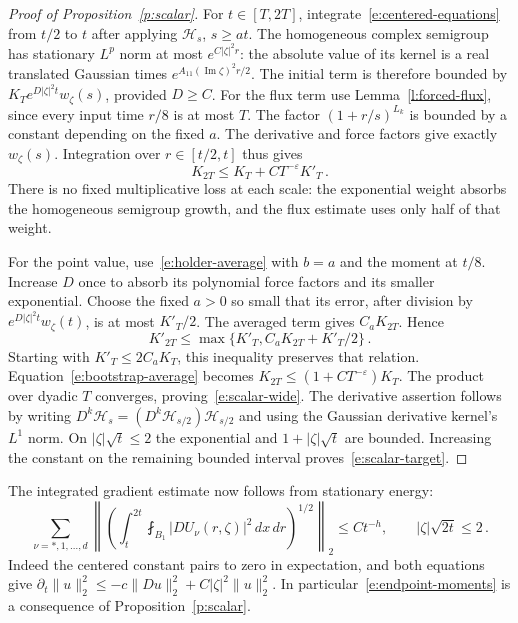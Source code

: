 \documentclass[11pt]{amsart}
\theoremstyle{definition}
\theoremstyle{remark}
\numberwithin{equation}{section}
\begin{document}
\begin{proof}[Proof of Proposition~\ref{p:scalar}]
For $t\in[T,2T]$, integrate~\eqref{e:centered-equations} from $t/2$ to $t$ after applying $\mathcal H_s$, $s\geq at$. The homogeneous complex semigroup has stationary $L^p$ norm at most $e^{C|\zeta|^2r}$: the absolute value of its kernel is a real translated Gaussian times $e^{A_{11}(\operatorname{Im}\zeta)^2r/2}$. The initial term is therefore bounded by $K_Te^{D|\zeta|^2t}w_\zeta(s)$, provided $D\geq C$. For the flux term use Lemma~\ref{l:forced-flux}, since every input time $r/8$ is at most $T$. The factor $(1+r/s)^{L_k}$ is bounded by a constant depending on the fixed $a$. The derivative and force factors give exactly $w_\zeta(s)$. Integration over $r\in[t/2,t]$ thus gives
\begin{equation}\label{e:bootstrap-average}
 K_{2T}\leq K_T+CT^{-\varepsilon}K'_T\, .
\end{equation}
There is no fixed multiplicative loss at each scale: the exponential weight absorbs the homogeneous semigroup growth, and the flux estimate uses only half of that weight.

For the point value, use~\eqref{e:holder-average} with $b=a$ and the moment at $t/8$. Increase $D$ once to absorb its polynomial force factors and its smaller exponential. Choose the fixed $a>0$ so small that its error, after division by $e^{D|\zeta|^2t}w_\zeta(t)$, is at most $K'_T/2$. The averaged term gives $C_aK_{2T}$. Hence
\begin{equation*}
 K'_{2T}\leq\max\{K'_T,C_aK_{2T}+K'_T/2\}\, .
\end{equation*}
Starting with $K'_T\leq2C_aK_T$, this inequality preserves that relation. Equation~\eqref{e:bootstrap-average} becomes $K_{2T}\leq(1+CT^{-\varepsilon})K_T$. The product over dyadic $T$ converges, proving~\eqref{e:scalar-wide}. The derivative assertion follows by writing $D^k\mathcal H_s=(D^k\mathcal H_{s/2})\mathcal H_{s/2}$ and using the Gaussian derivative kernel's $L^1$ norm. On $|\zeta|\sqrt t\leq2$ the exponential and $1+|\zeta|\sqrt t$ are bounded. Increasing the constant on the remaining bounded interval proves~\eqref{e:scalar-target}.
\end{proof}

The integrated gradient estimate now follows from stationary energy:
\begin{equation}\label{e:energy-target}
 \sum_{\nu=*,1,\ldots,d}
 \left\|\left(\int_t^{2t}\fint_{B_1}|DU_\nu(r,\zeta)|^2\,dx\,dr
                 \right)^{1/2}\right\|_2
 \leq Ct^{-h},\qquad |\zeta|\sqrt{2t}\leq2\, .
\end{equation}
Indeed the centered constant pairs to zero in expectation, and both equations give $\partial_t\|u\|_2^2\leq-c\|Du\|_2^2+C|\zeta|^2\|u\|_2^2$. In particular~\eqref{e:endpoint-moments} is a consequence of Proposition~\ref{p:scalar}.
\end{document}
